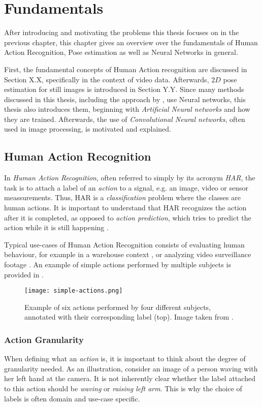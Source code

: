 \chapter{Fundamentals}
After introducing and motivating the problems this thesis focuses on in the previous chapter, this chapter gives an overview over the fundamentals of Human Action Recognition, Pose estimation as well as Neural Networks in general.

First, the fundamental concepts of Human Action recognition are discussed in Section X.X, specifically in the context of video data.
Afterwards, $2D$ pose estimation for still images is introduced in Section Y.Y.
Since many methods discussed in this thesis, including the approach by \cite{luvizon_2d/3d_2018}, use Neural networks, this thesis also introduces them, beginning with \textit{Artificial Neural networks} and how they are trained.
Afterwards, the use of \textit{Convolutional Neural networks}, often used in image processing, is motivated and explained.

\section{Human Action Recognition}
In \textit{Human Action Recognition}, often referred to simply by its acronym \textit{HAR}, the task is to attach a label of an \textit{action} to a signal, e.g. an image, video or sensor meassurements.
Thus, HAR is a \textit{classification} problem where the classes are human actions.
It is important to understand that HAR recognizes the action after it is completed, as opposed to \textit{action prediction}, which tries to predict the action while it is still happening \cite{kong_human_2018}.

Typical use-cases of Human Action Recognition consists of evaluating human behaviour, for example in a warehouse context \cite{reining_towards_2018}, or analyzing video surveillance footage \cite{htike_human_2014}.
An example of simple actions performed by multiple subjects is provided in .

\begin{figure}[htb!]
    \centering
    \texttt{[image: simple-actions.png]}
    \caption{Example of six actions performed by four different subjects, annotated with their corresponding label (top). Image taken from \cite{laptev_learning_2008}. }
    \label{fig:simple-actions}
\end{figure}

\subsection{Action Granularity}
When defining what an \textit{action} is, it is important to think about the degree of granularity needed.
As an illustration, consider an image of a person waving with her left hand at the camera.
It is not inherently clear whether the label attached to this action should be \textit{waving} or \textit{raising left arm}.
This is why the choice of labels is often domain and use-case specific.

